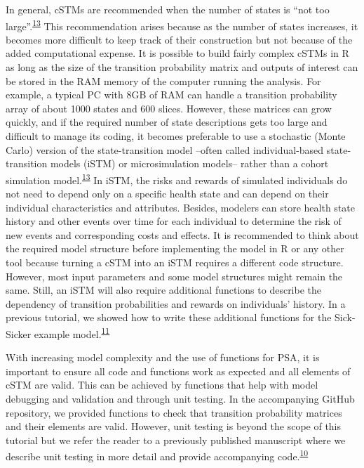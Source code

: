 \documentclass[
]{article}
\begin{document}
In general, cSTMs are recommended when the number of states is ``not too large''.\textsuperscript{\protect\hyperlink{ref-Siebert2012c}{13}} This recommendation arises because as the number of states increases, it becomes more difficult to keep track of their construction but not because of the added computational expense. It is possible to build fairly complex cSTMs in R as long as the size of the transition probability matrix and outputs of interest can be stored in the RAM memory of the computer running the analysis. For example, a typical PC with 8GB of RAM can handle a transition probability array of about 1000 states and 600 slices. However, these matrices can grow quickly, and if the required number of state descriptions gets too large and difficult to manage its coding, it becomes preferable to use a stochastic (Monte Carlo) version of the state-transition model --often called individual-based state-transition models (iSTM) or microsimulation models-- rather than a cohort simulation model.\textsuperscript{\protect\hyperlink{ref-Siebert2012c}{13}} In iSTM, the risks and rewards of simulated individuals do not need to depend only on a specific health state and can depend on their individual characteristics and attributes. Besides, modelers can store health state history and other events over time for each individual to determine the risk of new events and corresponding costs and effects. It is recommended to think about the required model structure before implementing the model in R or any other tool because turning a cSTM into an iSTM requires a different code structure. However, most input parameters and some model structures might remain the same. Still, an iSTM will also require additional functions to describe the dependency of transition probabilities and rewards on individuals' history. In a previous tutorial, we showed how to write these additional functions for the Sick-Sicker example model.\textsuperscript{\protect\hyperlink{ref-Krijkamp2018}{11}}

With increasing model complexity and the use of functions for PSA, it is important to ensure all code and functions work as expected and all elements of cSTM are valid. This can be achieved by functions that help with model debugging and validation and through unit testing. In the accompanying GitHub repository, we provided functions to check that transition probability matrices and their elements are valid. However, unit testing is beyond the scope of this tutorial but we refer the reader to a previously published manuscript where we describe unit testing in more detail and provide accompanying code.\textsuperscript{\protect\hyperlink{ref-Alarid-Escudero2019e}{10}}
\end{document}
